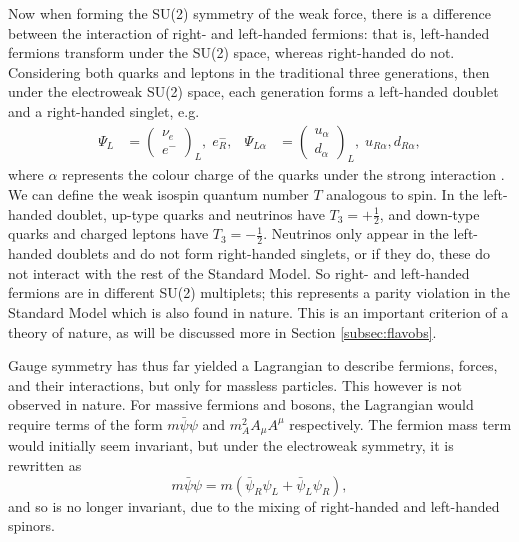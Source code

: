 \documentclass[a4paper,12pt]{article}
\begin{document}
Now when forming the SU(2) symmetry of the weak force, there is a difference between the interaction of right- and left-handed fermions: that is, left-handed fermions transform under the SU(2) space, whereas right-handed do not.
Considering both quarks and leptons in the traditional three generations, then under the electroweak SU(2) space, each generation forms a left-handed doublet and a right-handed singlet, e.g.
\begin{align}
    \label{eq:doublet}
    \Psi_L &=\begin{pmatrix} \nu_e \\ e^- \end{pmatrix}_L,\; e_R^-, & \Psi_{L\alpha} &=\begin{pmatrix} u_\alpha \\ d_\alpha\end{pmatrix}_L,\; u_{R\alpha},d_{R\alpha},
\end{align}
where $\alpha$ represents the colour charge of the quarks under the strong interaction \cite{kane}.
We can define the weak isospin quantum number $T$ analogous to spin. 
In the left-handed doublet, up-type quarks and neutrinos have $T_3=+\frac12$, and down-type quarks and charged leptons have $T_3=-\frac12$.
Neutrinos only appear in the left-handed doublets and do not form right-handed singlets, or if they do, these do not interact with the rest of the Standard Model.
So right- and left-handed fermions are in different SU(2) multiplets; this represents a parity violation in the Standard Model which is also found in nature. 
This is an important criterion of a theory of nature, as will be discussed more in Section \ref{subsec:flavobs}.

Gauge symmetry has thus far yielded a Lagrangian to describe fermions, forces, and their interactions, but only for massless particles. 
This however is not observed in nature. 
For massive fermions and bosons, the Lagrangian would require terms of the form $m\bar{\psi}\psi$ and $m_A^2A_\mu A^\mu$ respectively.
The fermion mass term would initially seem invariant, but under the electroweak symmetry, it is rewritten as
\begin{equation}
    \label{eq:mass}
    m\bar{\psi}\psi = m(\bar{\psi}_R\psi_L+\bar{\psi}_L\psi_R),
\end{equation}
and so is no longer invariant, due to the mixing of right-handed and left-handed spinors. 
\end{document}
